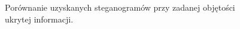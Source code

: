 {\begin{figure}
        \caption[Porównanie rezultatów]
        {
            Porównanie uzyskanych steganogramów przy zadanej objętości ukrytej informacji.
        }
        \label{fig:exp-vertex-results}
    \end{figure}

}
